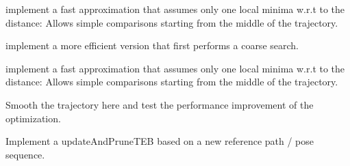 \begin{DoxyRefList}
implement a fast approximation that assumes only one local minima w.\+r.\+t to the distance\+: Allows simple comparisons starting from the middle of the trajectory. 
\item[全局 \mbox{\hyperlink{classteb__local__planner_1_1TimedElasticBand_a0c33751be8735fb910738827d1da3f94}{teb\+\_\+local\+\_\+planner\+::Timed\+Elastic\+Band\+::find\+Closest\+Trajectory\+Pose}} (const Point2d\+Container \&vertices, double $\ast$distance=NULL) const]\label{todo__todo000016}%
%
implement a more efficient version that first performs a coarse search. 

implement a fast approximation that assumes only one local minima w.\+r.\+t to the distance\+: Allows simple comparisons starting from the middle of the trajectory. 
\item[全局 \mbox{\hyperlink{classteb__local__planner_1_1TimedElasticBand_adae6e7423ed1583f5daedac57562384e}{teb\+\_\+local\+\_\+planner\+::Timed\+Elastic\+Band\+::update\+And\+Prune\+TEB}} (boost\+::optional$<$ const Pose\+SE2 \& $>$ new\+\_\+start, boost\+::optional$<$ const Pose\+SE2 \& $>$ new\+\_\+goal, int min\+\_\+samples=3)]\label{todo__todo000013}%
%
Smooth the trajectory here and test the performance improvement of the optimization. 

Implement a update\+And\+Prune\+TEB based on a new reference path / pose sequence.
\end{DoxyRefList}